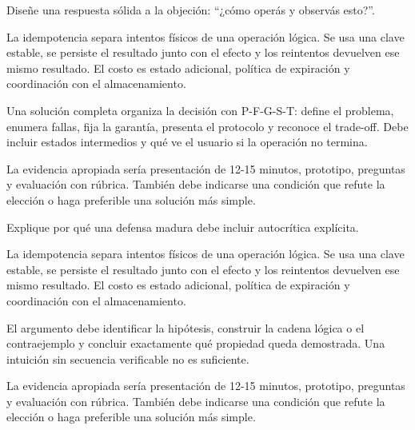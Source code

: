 \documentclass[variant=guia,cover=institutional,mode=screen]{ua-engineering-v6-article}
\begin{document}
\begin{uaexercise}
Diseñe una respuesta sólida a la objeción: “¿cómo operás y observás esto?”.
\end{uaexercise}
\begin{uaanswer}
La idempotencia separa intentos físicos de una operación lógica. Se usa una clave estable, se persiste el resultado junto con el efecto y los reintentos devuelven ese mismo resultado. El costo es estado adicional, política de expiración y coordinación con el almacenamiento.

Una solución completa organiza la decisión con P-F-G-S-T: define el problema, enumera fallas, fija la garantía, presenta el protocolo y reconoce el trade-off. Debe incluir estados intermedios y qué ve el usuario si la operación no termina.

La evidencia apropiada sería presentación de 12-15 minutos, prototipo, preguntas y evaluación con rúbrica. También debe indicarse una condición que refute la elección o haga preferible una solución más simple.
\end{uaanswer}

\begin{uaexercise}
Explique por qué una defensa madura debe incluir autocrítica explícita.
\end{uaexercise}
\begin{uaanswer}
La idempotencia separa intentos físicos de una operación lógica. Se usa una clave estable, se persiste el resultado junto con el efecto y los reintentos devuelven ese mismo resultado. El costo es estado adicional, política de expiración y coordinación con el almacenamiento.

El argumento debe identificar la hipótesis, construir la cadena lógica o el contraejemplo y concluir exactamente qué propiedad queda demostrada. Una intuición sin secuencia verificable no es suficiente.

La evidencia apropiada sería presentación de 12-15 minutos, prototipo, preguntas y evaluación con rúbrica. También debe indicarse una condición que refute la elección o haga preferible una solución más simple.
\end{uaanswer}
\end{document}
